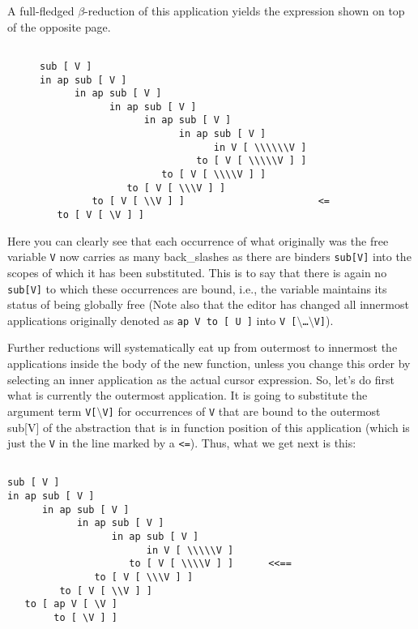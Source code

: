 A full-fledged $\beta$-reduction of this application yields the expression
 shown on top of the opposite page.
\begin{figure}
\begin{verbatim}

sub [ V ]
in ap sub [ V ]
      in ap sub [ V ]
            in ap sub [ V ]
                  in ap sub [ V ]
                        in ap sub [ V ]
                              in V [ \\\\\\V ]
                           to [ V [ \\\\\V ] ]
                     to [ V [ \\\\V ] ]
               to [ V [ \\\V ] ]
         to [ V [ \\V ] ]                       <=
   to [ V [ \V ] ]

\end{verbatim}
\end{figure}
Here you can clearly see that each occurrence of what originally was the
free variable {\tt V} now carries as many back\_slashes as there are
binders {\tt sub[V]} into the scopes of which it has been substituted. This is to say
that there is again no {\tt sub[V]} to which these occurrences are bound,
i.e., the variable maintains its status of being globally free (Note also
that the editor has changed all innermost applications originally 
denoted as {\tt ap V to [ U ]} into {\tt V [$\setminus$\ldots$\setminus$V]}).

Further reductions will systematically eat up from outermost to innermost
the applications inside the body of the new function, unless you change 
this order by selecting an inner application as the actual 
cursor expression. So, let's do first  what is currently 
the outermost application. It
is going to substitute the argument term {\tt V[$\setminus$V]} for  
occurrences of {\tt V} that are bound to the outermost sub[V] of
 the abstraction that is in function position of this application
(which is just the {\tt V} in the line marked by a {\tt <=}). Thus,
what we get next is this:
\begin{verbatim}

sub [ V ]
in ap sub [ V ]
      in ap sub [ V ]
            in ap sub [ V ]
                  in ap sub [ V ]
                        in V [ \\\\\V ]
                     to [ V [ \\\\V ] ]      <<==
               to [ V [ \\\V ] ]
         to [ V [ \\V ] ]
   to [ ap V [ \V ]
        to [ \V ] ]

\end{verbatim}

